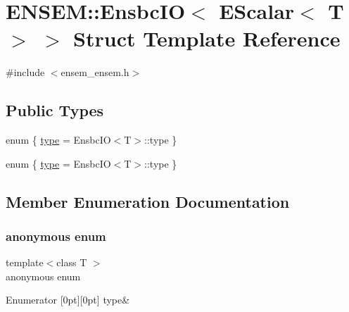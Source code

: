 \hypertarget{structENSEM_1_1EnsbcIO_3_01EScalar_3_01T_01_4_01_4}{}\section{E\+N\+S\+EM\+:\+:Ensbc\+IO$<$ E\+Scalar$<$ T $>$ $>$ Struct Template Reference}
\label{structENSEM_1_1EnsbcIO_3_01EScalar_3_01T_01_4_01_4}


{\ttfamily \#include $<$ensem\+\_\+ensem.\+h$>$}

\subsection*{Public Types}
\begin{DoxyCompactItemize}
\item 
enum \{ \mbox{\hyperlink{structENSEM_1_1EnsbcIO_3_01EScalar_3_01T_01_4_01_4_ac646de0b09040fbe5aa03939f2ca71fba91b43cfd0a234b7ecf01fb42ee56c00b}{type}} = Ensbc\+IO$<$T$>$\+:\+:type
 \}
\item 
enum \{ \mbox{\hyperlink{structENSEM_1_1EnsbcIO_3_01EScalar_3_01T_01_4_01_4_ac646de0b09040fbe5aa03939f2ca71fba91b43cfd0a234b7ecf01fb42ee56c00b}{type}} = Ensbc\+IO$<$T$>$\+:\+:type
 \}
\end{DoxyCompactItemize}


\subsection{Member Enumeration Documentation}
\mbox{\label{structENSEM_1_1EnsbcIO_3_01EScalar_3_01T_01_4_01_4_a8131f1b4684ee0bbe8708b17a73dcf58}} 
\subsubsection{\texorpdfstring{anonymous enum}{anonymous enum}}
{\footnotesize\ttfamily template$<$class T $>$ \\
anonymous enum}

\begin{DoxyEnumFields}{Enumerator}
[0pt][0pt]{}\mbox{\label{structENSEM_1_1EnsbcIO_3_01EScalar_3_01T_01_4_01_4_ac646de0b09040fbe5aa03939f2ca71fba91b43cfd0a234b7ecf01fb42ee56c00b}} 
type&\\
\hline

\end{DoxyEnumFields}
\mbox{\label{structENSEM_1_1EnsbcIO_3_01EScalar_3_01T_01_4_01_4_ac646de0b09040fbe5aa03939f2ca71fb}} 
